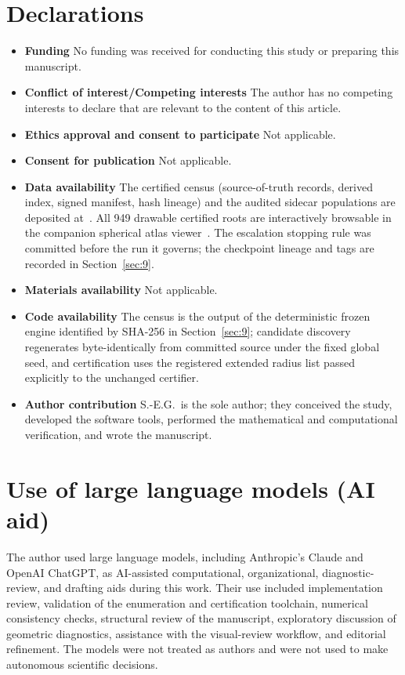 \documentclass[pdflatex,sn-mathphys-num]{sn-jnl}
\begin{document}
\section*{Declarations}
\begin{itemize}
\item \textbf{Funding} No funding was received for conducting this study or preparing this manuscript.
\item \textbf{Conflict of interest/Competing interests} The author has no competing interests to declare that are relevant to the content of this article.
\item \textbf{Ethics approval and consent to participate} Not applicable.
\item \textbf{Consent for publication} Not applicable.
\item \textbf{Data availability} The certified census (source-of-truth records, derived index, signed manifest, hash lineage) and the audited sidecar populations are deposited at~\cite{sphericaldataset}.
All 949 drawable certified roots are interactively browsable in the companion spherical atlas viewer~\cite{sphericalviewer}. The escalation stopping rule was committed before the run it governs; the checkpoint lineage and tags are recorded in Section~\ref{sec:9}.
\item \textbf{Materials availability} Not applicable.
\item \textbf{Code availability} The census is the output of the deterministic frozen engine
identified by SHA-256 in Section~\ref{sec:9}; candidate discovery regenerates byte-identically from committed source under the fixed global seed, and certification uses the registered extended radius list passed explicitly to the unchanged certifier.
\item \textbf{Author contribution} S.-E.G.\ is the sole author; they conceived the study, developed the software tools, performed the mathematical and computational verification, and wrote the manuscript.
\end{itemize}

\section*{Use of large language models (AI aid)}
The author used large language models, including Anthropic's Claude and OpenAI ChatGPT, as AI-assisted computational, organizational, diagnostic-review, and drafting aids during this work. Their use included implementation review, validation of the enumeration and certification toolchain, numerical consistency checks, structural review of the manuscript, exploratory discussion of geometric diagnostics, assistance with the visual-review workflow, and editorial refinement. The models were not treated as authors and were not used to make autonomous scientific decisions.
\end{document}
